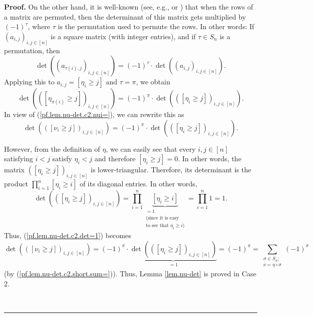\documentclass
[numbers=enddot,12pt,final,onecolumn,notitlepage,english]{scrartcl}%
\theoremstyle{definition}
\newenvironment{proof}[1][Proof]{\noindent\textbf{#1.} }{\ \rule{0.5em}{0.5em}}
\let\sumnonlimits\sum
\let\prodnonlimits\prod
\renewcommand{\sum}{\sumnonlimits\limits}
\renewcommand{\prod}{\prodnonlimits\limits}
\newenvironment{vershort}{}{}
\begin{document}
\begin{proof}
On the other hand, it is well-known (see, e.g., \cite[Corollary 6.4.15]{21s}
or \cite[Lemma 6.17 \textbf{(a)}]{detnotes}) that when the rows of a matrix
are permuted, then the determinant of this matrix gets multiplied by $\left(
-1\right)  ^{\tau}$, where $\tau$ is the permutation used to permute the rows.
In other words: If $\left(  a_{i,j}\right)  _{i,j\in\left[  n\right]  }$ is a
square matrix (with integer entries), and if $\tau\in S_{n}$ is a permutation,
then%
\[
\det\left(  \left(  a_{\tau\left(  i\right)  ,j}\right)  _{i,j\in\left[
n\right]  }\right)  =\left(  -1\right)  ^{\tau}\cdot\det\left(  \left(
a_{i,j}\right)  _{i,j\in\left[  n\right]  }\right)  .
\]
Applying this to $a_{i,j}=\left[  \eta_{i}\geq j\right]  $ and $\tau=\pi$, we
obtain%
\[
\det\left(  \left(  \left[  \eta_{\pi\left(  i\right)  }\geq j\right]
\right)  _{i,j\in\left[  n\right]  }\right)  =\left(  -1\right)  ^{\pi}%
\cdot\det\left(  \left(  \left[  \eta_{i}\geq j\right]  \right)
_{i,j\in\left[  n\right]  }\right)  .
\]
In view of (\ref{pf.lem.nu-det.c2.nui=}), we can rewrite this as%
\begin{equation}
\det\left(  \left(  \left[  \nu_{i}\geq j\right]  \right)  _{i,j\in\left[
n\right]  }\right)  =\left(  -1\right)  ^{\pi}\cdot\det\left(  \left(  \left[
\eta_{i}\geq j\right]  \right)  _{i,j\in\left[  n\right]  }\right)  .
\label{pf.lem.nu-det.c2.det=1}%
\end{equation}


\begin{vershort}
However, from the definition of $\eta$, we can easily see that every
$i,j\in\left[  n\right]  $ satisfying $i<j$ satisfy $\eta_{i}<j$ and therefore
$\left[  \eta_{i}\geq j\right]  =0$. In other words, the matrix $\left(
\left[  \eta_{i}\geq j\right]  \right)  _{i,j\in\left[  n\right]  }$ is
lower-triangular. Therefore, its determinant is the product $\prod_{i=1}%
^{n}\left[  \eta_{i}\geq i\right]  $ of its diagonal entries. In other words,%
\[
\det\left(  \left(  \left[  \eta_{i}\geq j\right]  \right)  _{i,j\in\left[
n\right]  }\right)  =\prod_{i=1}^{n}\underbrace{\left[  \eta_{i}\geq i\right]
}_{\substack{=1\\\text{(since it is easy}\\\text{to see that }\eta_{i}\geq
i\text{)}}}=\prod_{i=1}^{n}1=1.
\]
Thus, (\ref{pf.lem.nu-det.c2.det=1}) becomes%
\[
\det\left(  \left(  \left[  \nu_{i}\geq j\right]  \right)  _{i,j\in\left[
n\right]  }\right)  =\left(  -1\right)  ^{\pi}\cdot\underbrace{\det\left(
\left(  \left[  \eta_{i}\geq j\right]  \right)  _{i,j\in\left[  n\right]
}\right)  }_{=1}=\left(  -1\right)  ^{\pi}=\sum_{\substack{\sigma\in
S_{n};\\\nu=\eta\circ\sigma}}\left(  -1\right)  ^{\sigma}%
\]
(by (\ref{pf.lem.nu-det.c2.short.sum=})). Thus, Lemma \ref{lem.nu-det} is
proved in Case 2. \medskip
\end{vershort}


\end{proof}
\end{document}
